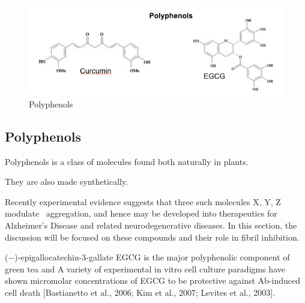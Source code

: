 


\begin{figure}
\centering
\includegraphics[width=6in]{figures/introduction/polyphenols.png}
\caption[Small molecule binders]{Polyphenols}
\label{fig:polyphenols}
\end{figure}

\subsection{Polyphenols}
Polyphenols is a class of molecules found both naturally in plants.

They are also made synthetically.

Recently experimental evidence suggests that three such molecules X, Y, Z modulate \abeta\ aggregation, and hence may be developed into therapeutics for Alzheimer's Disease and related neurodegenerative diseases.  In this section, the discussion will be focused on these compounds and their role in fibril inhibition.

(−)-epigallocatechin-3-gallate EGCG is the major polyphenolic component of green tea and  A variety of experimental in vitro cell culture paradigms have shown micromolar concentrations of EGCG to be protective against Ab-induced cell death [Bastianetto et al., 2006; Kim et al., 2007; Levites et al., 2003].

